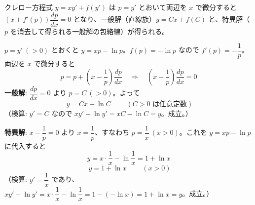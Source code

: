 
クレロー方程式 $y = xy' + f(y')$ は $p = y'$ とおいて両辺を $x$ で微分すると $(x + f'(p))\dfrac{dp}{dx} = 0$ となり、一般解（直線族）$y = Cx + f(C)$ と、特異解（$p$ を消去して得られる一般解の包絡線）が得られる。

$p = y'\ (>0)$ とおくと $y = xp - \ln p$。$f(p) = -\ln p$ なので $f'(p) = -\dfrac{1}{p}$。両辺を $x$ で微分すると
\[
p = p + \left(x - \frac{1}{p}\right)\frac{dp}{dx}
\quad\Longrightarrow\quad
\left(x - \frac{1}{p}\right)\frac{dp}{dx} = 0
\]
\textbf{一般解}: $\dfrac{dp}{dx} = 0$ より $p = C\ (>0)$。よって
\[
\boxed{\; y = Cx - \ln C \;}
\qquad (C > 0 \text{ は任意定数})
\]
（検算: $y' = C$ なので $xy' - \ln y' = xC - \ln C = y$。成立。）

\textbf{特異解}: $x - \dfrac{1}{p} = 0$ より $x = \dfrac{1}{p}$、すなわち $p = \dfrac{1}{x}\ (x > 0)$。これを $y = xp - \ln p$ に代入すると
\[
y = x \cdot \frac{1}{x} - \ln\frac{1}{x} = 1 + \ln x
\]
\[
\boxed{\; y = 1 + \ln x \;}
\qquad (x > 0)
\]
（検算: $y' = \dfrac{1}{x}$ であり、$xy' - \ln y' = x \cdot \dfrac{1}{x} - \ln\dfrac{1}{x} = 1 - (-\ln x) = 1 + \ln x = y$。成立。）
